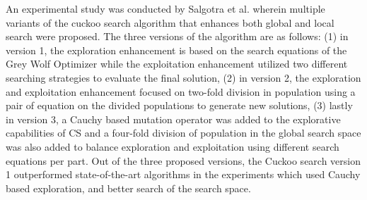 An experimental study was conducted by Salgotra et al. \cite{salgotra2018new} wherein multiple variants of the cuckoo search algorithm that enhances both global and local search were proposed. The three versions of the algorithm are as follows: (1) in version 1, the exploration enhancement is based on the search equations of the Grey Wolf Optimizer while the exploitation enhancement utilized two different searching strategies to evaluate the final solution, (2) in version 2, the exploration and exploitation enhancement focused on two-fold division in population using a pair of equation on the divided populations to generate new solutions, (3) lastly in version 3, a Cauchy based mutation operator was added to the explorative capabilities of CS and a four-fold division of population in the global search space was also added to balance exploration and exploitation using different search equations per part. Out of the three proposed versions, the Cuckoo search version 1 outperformed state-of-the-art algorithms in the experiments which used Cauchy based exploration, and better search of the search space.